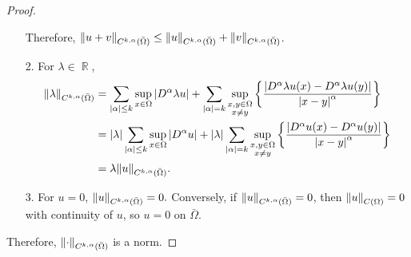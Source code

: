 \documentclass{article}
\DeclareMathOperator{\rr}{\mathbb{R}}
\begin{document}
\begin{proof}
\begin{enumerate}
\begin{equation*}
\end{equation*}
Therefore, $\norm{u+v}_{C^{k,\alpha}(\bar{\Omega})}\leq \norm{u}_{C^{k,\alpha}(\bar{\Omega})}+\norm{v}_{C^{k,\alpha}(\bar{\Omega})}$.
\item[2.] For $\lambda\in \rr$,
\begin{equation*}
\begin{split}
\norm{\lambda}_{C^{k,\alpha}(\bar{\Omega})}&=\sum\limits_{\abs{\alpha}\leq k}\sup_{x\in \Omega}\abs{D^\alpha \lambda u}+\sum\limits_{\abs{\alpha}=k}\sup_{\substack{x,y\in \Omega \\ x\neq y}} \left\{  \frac{\abs{D^\alpha \lambda u(x)-D^\alpha \lambda u(y)}}{\abs{x-y}^\alpha}\right\} \\
&=\abs{\lambda}\sum\limits_{\abs{\alpha}\leq k}\sup_{x\in \Omega}\abs{D^\alpha  u}+\abs{\lambda}\sum\limits_{\abs{\alpha}=k}\sup_{\substack{x,y\in \Omega \\ x\neq y}} \left\{  \frac{\abs{D^\alpha  u(x)-D^\alpha  u(y)}}{\abs{x-y}^\alpha}\right\}\\
&=\lambda\norm{u}_{C^{k,\alpha}(\bar{\Omega})}.
\end{split}
\end{equation*}
\item[3.] For $u=0$, $\norm{u}_{C^{k,\alpha}(\bar{\Omega})}=0.$ Conversely, if $\norm{u}_{C^{k,\alpha}(\bar{\Omega})}=0$, then $\norm{u}_{C(\Omega)}=0$ with continuity of $u$, so $u=0$ on $\bar{\Omega}$.
\end{enumerate}
Therefore, $\norm{\cdot}_{C^{k,\alpha}(\bar{\Omega})}$ is a norm.



\end{proof}
\end{document}
